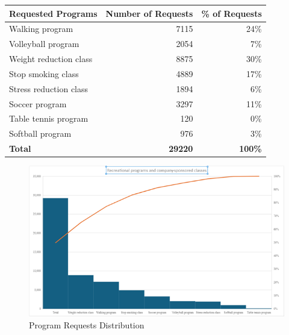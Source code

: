 \begin{tabular}{|l|r|r|}
\hline
\textbf{Requested Programs} & \textbf{Number of Requests} & \textbf{\% of Requests} \\
\hline
Walking program & 7115 & 24\% \\
Volleyball program & 2054 & 7\% \\
Weight reduction class & 8875 & 30\% \\
Stop smoking class & 4889 & 17\% \\
Stress reduction class & 1894 & 6\% \\
Soccer program & 3297 & 11\% \\
Table tennis program & 120 & 0\% \\
Softball program & 976 & 3\% \\
\hline
\textbf{Total} & \textbf{29220} & \textbf{100\%} \\
\hline
\end{tabular}

\begin{figure}[h!]
    \centering
    \includegraphics[width=\textwidth]{images/image.png}
    \caption{Program Requests Distribution}
\end{figure}